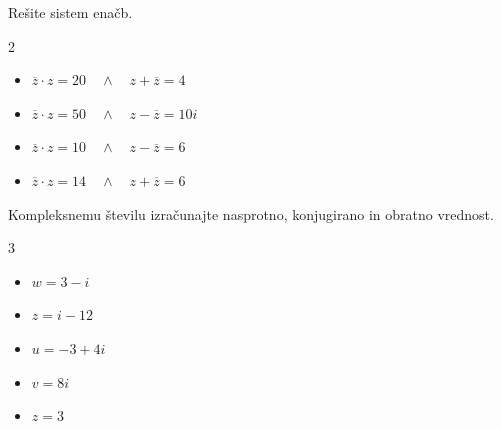             \begin{naloga}
                Rešite sistem enačb.
                \begin{multicols}{2}
                    \begin{itemize}
                        \item $\overline{z}\cdot z= 20 \quad\land\quad z+\overline{z}=4 $ 
                        \item $\overline{z}\cdot z=50 \quad\land\quad z-\overline{z}=10i$ 
                        \item $\overline{z}\cdot z=10 \quad\land\quad z-\overline{z}=6$ 
                        \item $\overline{z}\cdot z=14 \quad\land\quad z+\overline{z}=6$ 
                    \end{itemize}
                \end{multicols}

            \end{naloga}


            \begin{naloga}
                Kompleksnemu  številu izračunajte nasprotno, konjugirano in obratno vrednost.
                \begin{multicols}{3}
                    \begin{itemize}
                        \item $w=3-i$ 
                        \item $z=i-12$ 
                        \item $u=-3+4i$ 
                        \item $v=8i$ 
                        \item $z=3$ 
                    \end{itemize}
                \end{multicols}

            \end{naloga}


